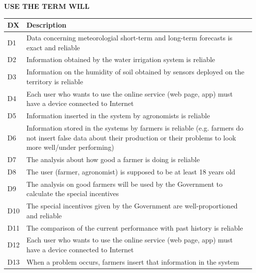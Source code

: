 \textbf{USE THE TERM WILL}
\begin{table}[H]
    \setlength\arrayrulewidth{1pt}
    \centering
    \begin{tabular}{|l|m{}|}
        \rowcolor{myblue}
        \hline
        \color{white}DX & \color{white}Description \\
        \hline
        \textsc{D1}  &    Data concerning meteorologial short-term and long-term forecasts is exact and reliable \\
        \hline
        \textsc{D2}     &   Information obtained by the water irrigation system is reliable \\
        \hline
        \textsc{D3}  &    Information on the humidity of soil obtained by sensors deployed on the territory is reliable\\
        \hline
        \textsc{D4}  &    Each user who wants to use the online service (web page, app) must have a device connected to Internet\\
        \hline
        \textsc{D5}  &    Information inserted in the system by agronomists is reliable\\
        \hline
        \textsc{D6}  &    Information stored in the systems by farmers is reliable (e.g. farmers do not insert false data about their production or their problems to look more well/under performing)\\
        \hline
        \textsc{D7}  &    The analysis about how good a farmer is doing is reliable\\
        \hline
        \textsc{D8}  &    The user (farmer, agronomist) is supposed to be at least 18 years old\\
        \hline
        \textsc{D9}  &    The analysis on good farmers will be used by the Government to calculate the special incentives \\
        \hline
        \textsc{D10}     &   The special incentives given by the Government are well-proportioned and reliable \\
        \hline
        \textsc{D11}  &    The comparison of the current performance with past history is reliable\\
        \hline
        \textsc{D12}  &    Each user who wants to use the online service (web page, app) must have a device connected to Internet\\
        \hline
        \textsc{D13}  &    When a problem occurs, farmers insert that information in the system\\

\end{tabular}
\end{table}
